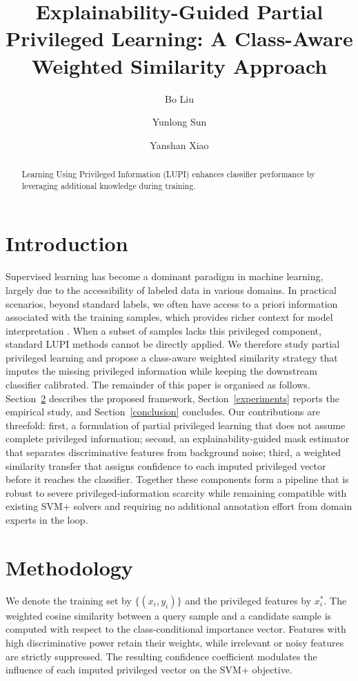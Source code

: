 \documentclass[11pt]{article}
\title{Explainability-Guided Partial Privileged Learning: A Class-Aware Weighted Similarity Approach}
\author[aff1]{Bo Liu}
\author[aff1]{Yunlong Sun}
\author[aff2]{Yanshan Xiao}
\affil[aff1]{School of Automation, Guangdong University of Technology, Guangzhou 510006, China}
\affil[aff2]{School of Computer Science, Guangdong University of Technology, Guangzhou 510006, China}
\begin{document}
\maketitle

\begin{abstract}
Learning Using Privileged Information (LUPI) enhances classifier performance by
leveraging additional knowledge during training.
\end{abstract}

\section{Introduction}\label{introduction}

Supervised learning has become a dominant paradigm in machine learning, largely
due to the accessibility of labeled data in various domains. In practical
scenarios, beyond standard labels, we often have access to a priori information
associated with the training samples, which provides richer context for model
interpretation \cite{vapnik2009new}. When a subset of samples lacks this
privileged component, standard LUPI methods cannot be directly applied. We
therefore study partial privileged learning and propose a class-aware weighted
similarity strategy that imputes the missing privileged information while
keeping the downstream classifier calibrated. The remainder of this paper is
organised as follows. Section~\ref{method} describes the proposed framework,
Section~\ref{experiments} reports the empirical study, and Section~\ref{conclusion}
concludes. Our contributions are threefold: first, a formulation of partial
privileged learning that does not assume complete privileged information;
second, an explainability-guided mask estimator that separates discriminative
features from background noise; third, a weighted similarity transfer that
assigns confidence to each imputed privileged vector before it reaches the
classifier. Together these components form a pipeline that is robust to
severe privileged-information scarcity while remaining compatible with
existing SVM+ solvers and requiring no additional annotation effort from
domain experts in the loop.

\section{Methodology}\label{method}

We denote the training set by $\{(x_i, y_i)\}$ and the privileged features by
$x_i^{*}$. The weighted cosine similarity between a query sample and a
candidate sample is computed with respect to the class-conditional importance
vector. Features with high discriminative power retain their weights, while
irrelevant or noisy features are strictly suppressed. The resulting confidence
coefficient modulates the influence of each imputed privileged vector on the
SVM+ objective.
\end{document}
